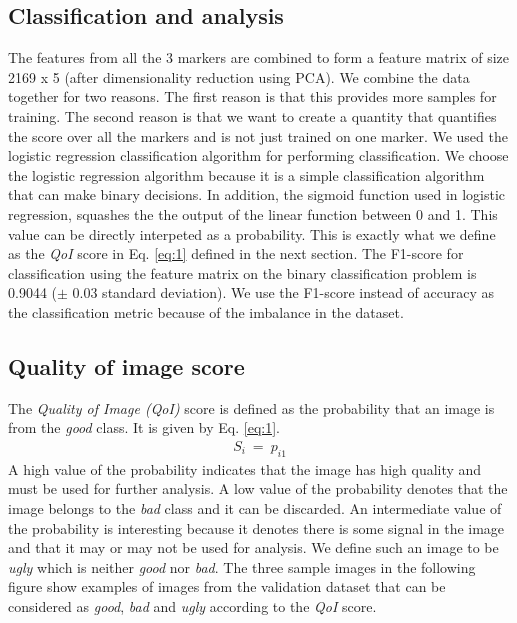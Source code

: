 \subsection{Classification and analysis}
The features from all the 3 markers are combined to form a feature matrix of size 2169 x 5 (after dimensionality reduction using PCA). We combine the data together for two reasons. The first reason is that this provides more samples for training. The second reason is that we want to create a quantity that quantifies the score over all the markers and is not just trained on one marker. 
We used the logistic regression classification algorithm for performing classification. We choose the logistic regression algorithm because it is a simple classification algorithm that can make binary decisions. In addition, the sigmoid function used in logistic regression, squashes the the output of the linear function between 0 and 1. This value can be directly interpeted as a probability. This is exactly what we define as the \textit{QoI} score in Eq. \ref{eq:1} defined in the next section.
The F1-score for classification using the feature matrix on the binary classification problem is 0.9044 ($\pm$  0.03 standard deviation). We use the F1-score instead of accuracy as the classification metric because of the imbalance in the dataset.

\subsection{Quality of image score}
The \textit{Quality of Image (QoI)} score is defined as the probability that an image is from the \textit{good} class. It is given by Eq. \ref{eq:1}.
\begin{equation}
\begin{gathered} 
S_i \ =  \ p_{i1} 
\end{gathered}
\label{eq:1}
\end{equation}
A high value of the probability indicates that the image has high quality and must be used for further analysis. A low value of the probability denotes that the image belongs to the \textit{bad} class and it can be discarded. An intermediate value of the probability is interesting because it denotes there is some signal in the image and that it may or may not be used for analysis. We define such an image to be \textit{ugly} which is neither \textit{good} nor \textit{bad}.
 The three sample images in the following figure show examples of images from the validation dataset that can be considered as \textit{good}, \textit{bad} and \textit{ugly} according to the \textit{QoI} score. 

